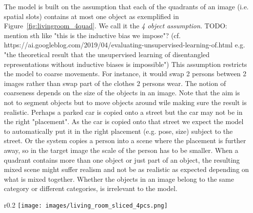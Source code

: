 \documentclass[12pt,a4paper]{article}
\begin{document}
The model is built on the assumption that each of the quadrants of an image (i.e. spatial slots) contains at most one object as exemplified in Figure~\ref{fig:livingroom_4quad}. We call it the \textit{4 object assumption}. TODO: mention sth like "this is the inductive bias we impose"? (cf. https://ai.googleblog.com/2019/04/evaluating-unsupervised-learning-of.html e.g. "the theoretical result that the unsupervised learning of disentangled representations without inductive biases is impossible") This assumption restricts the model to coarse movements. For instance, it would swap 2 persons between 2 images rather than swap part of the clothes 2 persons wear. The notion of coarseness depends on the size of the objects in an image. Note that the aim is not to segment objects but to move objects around wile making sure the result is realistic. Perhaps a parked car is copied onto a street but the car may not be in the right "placement". As the car is copied onto that street we expect the model to automatically put it in the right placement (e.g. pose, size) subject to the street. Or the system copies a person into a scene where the placement is further away, so in the target image the scale of the person has to be smaller. When a quadrant contains more than one object or just part of an object, the resulting mixed scene might suffer realism and not be as realistic as expected depending on what is mixed together. Whether the objects in an image belong to the same category or different categories, is irrelevant to the model.

\begin{wrapfigure}{r}{0.2\textwidth}
\texttt{[image: images/living\_room\_sliced\_4pcs.png]} 
\caption{An image split into quadrants.} %
\label{fig:livingroom_4quad}
\end{wrapfigure}
\end{document}
